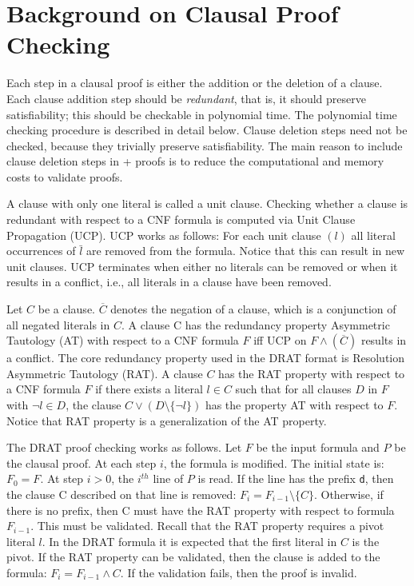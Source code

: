 \documentclass{article}
\begin{document}
\section{Background on Clausal Proof Checking}
\label{sec:drat}

Each step in a clausal proof is either the addition or the deletion of
a clause.  Each clause addition step should be {\em redundant},
that is, it should preserve satisfiability;
%
%
%
this should be checkable in polynomial time.  The polynomial time
checking procedure is described in detail below.  Clause deletion
steps need not be checked, because they trivially preserve
satisfiability.  The main reason to include clause deletion steps in
+ %
proofs is to reduce the computational and memory costs to validate
proofs.

A clause with only one literal is called a unit clause. Checking
whether a clause is redundant with respect to a CNF formula is
computed via Unit Clause Propagation (UCP). UCP works as follows:
For each unit clause $(l)$ all literal occurrences of $\bar l$ are removed
from the formula. Notice that this can result in new unit clauses.
UCP terminates when either no literals can be removed or when it
results in a conflict, i.e., all literals in a clause have been
removed.

Let $C$ be a clause. $\overline{C}$ denotes the negation of a clause, which
is a conjunction of all negated literals in $C$. A clause C has the
redundancy property Asymmetric Tautology (AT) with respect to a CNF
formula $F$ iff UCP on $F \land (\overline C)$ results in a conflict. The core
redundancy property used in the DRAT format is Resolution Asymmetric
Tautology (RAT). A clause $C$ has the RAT property with respect to a
CNF formula $F$ if there exists a literal $l \in C$ such that for all
clauses $D$ in $F$ with $\lnot l \in D$, the clause $C \lor (D \setminus \{\lnot l\})$
has the property AT with respect to $F$. Notice that RAT property is a
%
%
%
generalization of the AT property.

The DRAT proof checking works as follows. Let $F$ be the input formula
and $P$ be the clausal proof. At each step $i$, the formula is modified.
The initial state is: $F_{0} = F$. At step $i > 0$, the $i^{th}$ line of $P$ is
read. If the line has the prefix {\tt d}, then the clause C described on
that line is removed: $F_{i} = F_{i-1} \setminus \{C\}$. Otherwise, if there is
no prefix, then C must have the RAT property with respect to formula
$F_{i-1}$. This must be validated. Recall that the RAT property requires
a pivot literal $l$. In the DRAT formula it is expected that the first
literal in $C$ is the pivot. If the RAT property can be validated, then
the clause is added to the formula: $F_{i} = F_{i-1} \land C$. If the
validation fails, then the proof is invalid.
\end{document}
